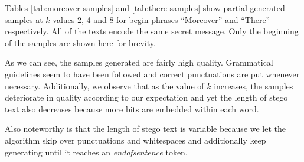 \documentclass[journal,onecolumn]{IEEEtran}
\begin{document}
\clearpage
Tables \ref{tab:moreover-samples} and \ref{tab:there-samples} show partial generated samples at $k$ values 2, 4 and 8 for begin phrases ``Moreover'' and ``There'' respectively. All of the texts encode the same secret message.
Only the beginning of the samples are shown here for brevity.


As we can see, the samples generated are fairly high quality. Grammatical guidelines seem
to have been followed and correct punctuations are put whenever necessary. Additionally, we 
observe that as the value of $k$ increases, the samples deteriorate in quality according to our expectation
and yet the length of stego text also decreases because more bits are embedded within each word.

Also noteworthy is that the length of stego text is variable because we let the algorithm skip over punctuations and whitespaces
and additionally keep generating until it reaches an \textit{endofsentence} token.

\bigskip
\end{document}
